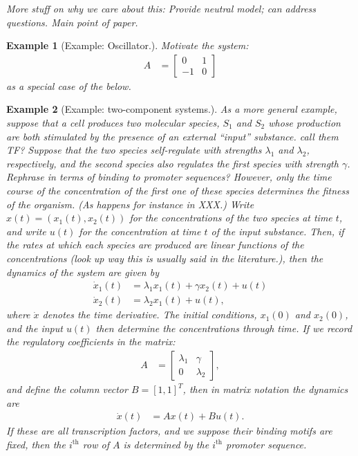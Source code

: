 \documentclass[11 pt]{article}
\newcommand{\plr}[1]{{\color{blue}\it #1}}
\newcommand{\ddt}{\dot}
\newtheorem{example}{Example}
\begin{document}
\plr{
    More stuff on why we care about this:  
Provide neutral model; can address questions.  
Main point of paper.
}

\begin{example}[Example: Oscillator.]
Motivate the system:
\begin{align*}
    A &= \left[\begin{matrix} 
        0 & 1 \\ 
       -1 & 0 
    \end{matrix}\right]
\end{align*}
as a special case of the below.

\end{example}


\begin{example}[Example: two-component systems.] \label{ex:2x2}
As a more general example,
suppose that a cell produces two molecular species, $S_1$ and $S_2$ 
whose production are both stimulated by the presence of an external ``input'' substance.
\plr{call them TF?}
Suppose that the two species self-regulate with strengths $\lambda_1$ and $\lambda_2$, respectively,
and the second species also regulates the first species with strength $\gamma$.
\plr{Rephrase in terms of binding to promoter sequences?}
However, only the time course of the concentration of
the first one of these species determines the fitness of the organism.
(As happens for instance in \plr{XXX}.)
Write $x(t) = (x_1(t),x_2(t))$ for the concentrations of the two species at time $t$,
and write $u(t)$ for the concentration at time $t$ of the input substance.
Then, if the rates at which each species are produced
are linear functions of the concentrations
\plr{(look up way this is usually said in the literature.)},
then the dynamics of the system are given by
\begin{align*}
    \ddt x_1(t) &= \lambda_1 x_1(t) + \gamma x_2(t) + u(t) \\
    \ddt x_2(t) &= \lambda_2 x_1(t) + u(t) ,
\end{align*}
where $\ddt x$ denotes the time derivative.
The initial conditions, $x_1(0)$ and $x_2(0)$, 
and the input $u(t)$ then determine the concentrations through time.
If we record the regulatory coefficients in the matrix:
\begin{align*}
    A &= \left[\begin{matrix} 
        \lambda_1 & \gamma \\ 
       0 & \lambda_2  
    \end{matrix}\right],
\end{align*}
and define the column vector $B = [1,1]^T$,
then in matrix notation the dynamics are
\begin{align*}
    \ddt x(t) &= A x(t) + B u(t) .
\end{align*}
If these are all transcription factors,
and we suppose their binding motifs are fixed,
then the $i^\text{th}$ row of $A$ is determined by the $i^\text{th}$ promoter sequence.

\end{example}
\end{document}
